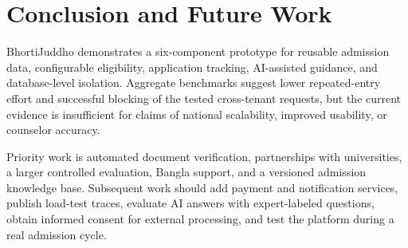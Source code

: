 \documentclass[conference,letterpaper]{IEEEtran}
\begin{document}
\section{Conclusion and Future Work}
BhortiJuddho demonstrates a six-component prototype for reusable admission data, configurable eligibility, application tracking, AI-assisted guidance, and database-level isolation. Aggregate benchmarks suggest lower repeated-entry effort and successful blocking of the tested cross-tenant requests, but the current evidence is insufficient for claims of national scalability, improved usability, or counselor accuracy.

Priority work is automated document verification, partnerships with universities, a larger controlled evaluation, Bangla support, and a versioned admission knowledge base. Subsequent work should add payment and notification services, publish load-test traces, evaluate AI answers with expert-labeled questions, obtain informed consent for external processing, and test the platform during a real admission cycle.
\end{document}
